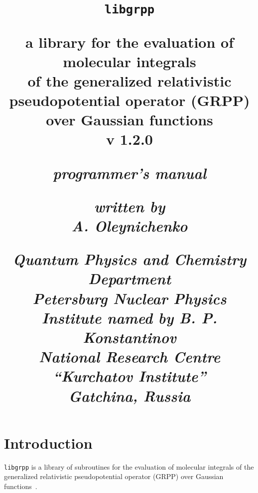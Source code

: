 \documentclass[12pt]{article}
\begin{document}

\title{
\normalsize

{\large \texttt{libgrpp}}

\bigskip

{\bf a library for the evaluation of molecular integrals \\
of the generalized relativistic pseudopotential operator (GRPP) over Gaussian functions \\
v 1.2.0}

\bigskip

\textit{programmer's manual}

\bigskip

\textit{written by \\
A. Oleynichenko}

\bigskip

\textit{Quantum Physics and Chemistry Department \\
Petersburg Nuclear Physics Institute named by B. P. Konstantinov \\
National Research Centre ``Kurchatov Institute'' \\
Gatchina, Russia}
}
\maketitle

\newpage

\tableofcontents

\newpage

\section{Introduction}

\texttt{libgrpp} is a library of subroutines for the evaluation of molecular integrals of the generalized relativistic pseudopotential operator (GRPP) over Gaussian functions~\cite{Oleynichenko:LIBGRPP:23}.
\end{document}
